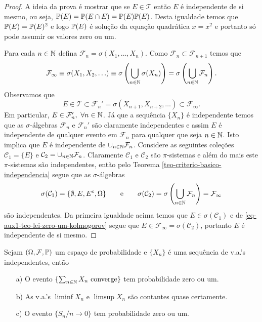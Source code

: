 \begin{proof}
A ideia da prova é mostrar que se $E\in\mathcal{T}$
então $E$ é independente de si mesmo, ou seja,
$\P(E)=\P(E\cap E)=\P(E)\P(E)$. Desta igualdade 
temos que $\P(E)=\P(E)^2$ e logo $\P(E)$ é solução 
da equação quadrática $x=x^2$ e portanto só pode 
assumir os valores zero ou um.   


Para cada $n\in\N$ defina $\mathcal{F}_n=\sigma(X_1,\ldots,X_n)$.
Como $\mathcal{F}_n\subset \mathcal{F}_{n+1}$ temos que  
\[
	\mathcal{F}_{\infty}
	\equiv
	\sigma(X_1,X_2,\ldots)
	\equiv
	\sigma\left( \bigcup_{n\in\N} \sigma(X_n) \right)
	=
	\sigma\left( \bigcup_{n\in\N} \mathcal{F}_n \right).
\]
Observamos que
\begin{equation}\label{eq-aux1-teo-lei-zero-um-kolmogorov}
	E\in \mathcal{T}\subset \mathcal{F}_n'
	=
	\sigma(X_{n+1},X_{n+2},\ldots)
	\subset 
	\mathcal{F}_{\infty}.
\end{equation}
Em particular, $E\in \mathcal{F}_n',\ \forall n\in\N$.
Já que a sequência $\{X_n\}$ é independente temos que
as $\sigma$-álgebras $\mathcal{F}_n$ e $\mathcal{F}_n'$
são claramente independentes e assim $E$ é independente
de qualquer evento em $\mathcal{F}_n$ para qualquer 
que seja $n\in\N$. Isto implica que $E$ é independente
de $\cup_{n\in\N} \mathcal{F}_n$.
Considere as seguintes coleções $\mathcal{C}_1=\{E\}$ 
e $\mathcal{C}_2=\cup_{n\in\N} \mathcal{F}_n$. Claramente
$\mathcal{C}_1$ e $\mathcal{C}_2$ são $\pi$-sistemas e 
além do mais este $\pi$-sistemas são independentes,
então pelo Teorema \ref{teo-criterio-basico-independencia}
segue que as $\sigma$-álgebras
	\[
	\sigma(\mathcal{C}_1)=\{\emptyset,E,E^c,\Omega\}
	\qquad
	\text{e}
	\qquad
	\sigma(\mathcal{C}_2)
		=\sigma\left( \bigcup_{n\in\N} \mathcal{F}_n \right)
		=\mathcal{F}_{\infty}
	\]
são independentes. Da primeira 
igualdade acima temos que 
$E\in \sigma(\mathcal{C}_1)$ e de 
\eqref{eq-aux1-teo-lei-zero-um-kolmogorov} 
segue que 
$E\in \mathcal{F}_{\infty}=\sigma(\mathcal{C}_2)$, 
portanto $E$ é independente de si mesmo.
\end{proof}













\begin{corolario}
Sejam $(\Omega,\F,\P)$ um espaço de probabilidade e 
$\{X_n\}$ é uma sequência de v.a.'s independentes, 
então 
	\begin{itemize}
		\item[a)]
		O evento $\{ \sum_{n\in\N} X_n\ \text{converge}\}$ tem probabilidade
		zero ou um.		
		
		\item[b)]
		As v.a.'s $\liminf X_n$ e $\limsup X_n$ são contantes quase certamente.
		
		\item[c)]
		O evento $\{S_n/n\to 0\}$ tem probabilidade zero ou um.		
		
	\end{itemize}
\end{corolario}



